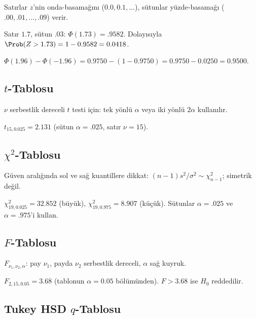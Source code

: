 Satırlar $z$'nin onda-basamağını ($0.0,0.1,\ldots$), sütunlar yüzde-basamağı ($.00,.01,\ldots,.09$) verir.

\begin{ornek}[$\Phi(1.73)$]
Satır $1.7$, sütun $.03$: $\Phi(1.73) = .9582$. Dolayısıyla $\Prob(Z>1.73)=1-0.9582=0.0418$.
\end{ornek}

\begin{ornek}
$\Phi(1.96)-\Phi(-1.96) = 0.9750-(1-0.9750) = 0.9750-0.0250 = 0.9500$.
\end{ornek}

\subsection{$t$-Tablosu}

$\nu$ serbestlik dereceli $t$ testi için: tek yönlü $\alpha$ veya iki yönlü $2\alpha$ kullanılır.

\begin{ornek}[İki yönlü \%95 $t$-aralığı, $\nu=15$]
$t_{15,0.025}=2.131$ (sütun $\alpha=.025$, satır $\nu=15$).
\end{ornek}

\subsection{$\chi^2$-Tablosu}

Güven aralığında sol ve sağ kuantillere dikkat: $(n-1)s^2/\sigma^2 \sim \chi^2_{n-1}$; simetrik değil.

\begin{ornek}[Varyans \%95 GA, $\nu=19$]
$\chi^2_{19,0.025}=32.852$ (büyük), $\chi^2_{19,0.975}=8.907$ (küçük). Sütunlar $\alpha=.025$ ve $\alpha=.975$'i kullan.
\end{ornek}

\subsection{$F$-Tablosu}

$F_{\nu_1,\nu_2,\alpha}$: pay $\nu_1$, payda $\nu_2$ serbestlik dereceli, $\alpha$ sağ kuyruk.

\begin{ornek}[ANOVA — $k=3$, $N=18$ ($\nu_1=2$, $\nu_2=15$)]
$F_{2,15,0.05}=3.68$ (tablonun $\alpha=0.05$ bölümünden). $F > 3.68$ ise $H_0$ reddedilir.
\end{ornek}

\subsection{Tukey HSD $q$-Tablosu}

